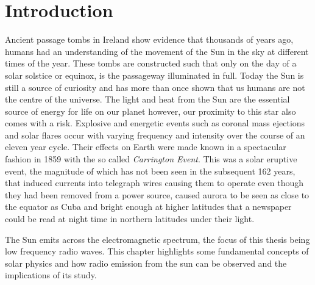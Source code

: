 \doublespacing
\chapter{Introduction}
\label{chap:intro}
Ancient passage tombs in Ireland show evidence that thousands of years ago, humans had an understanding of the movement of the Sun in the sky at different times of the year. These tombs are constructed such that only on the day of a solar solstice or equinox, is the passageway illuminated in full. Today the Sun is still a source of curiosity and has more than once shown that us humans are not the centre of the universe. The light and heat from the Sun are the essential source of energy for life on our planet however, our proximity to this star also comes with a risk. Explosive and energetic events such as coronal mass ejections and solar flares occur with varying frequency and intensity over the course of an eleven year cycle. Their effects on Earth were made known in a spectacular fashion in 1859 with the so called \textit{Carrington Event}. This was a solar eruptive event, the magnitude of which has not been seen in the subsequent 162 years, that induced currents into telegraph wires causing them to operate even though they had been removed from a power source, caused aurora to be seen as close to the equator as Cuba and bright enough at higher latitudes that a newspaper could be read at night time in northern latitudes under their light. 

The Sun emits across the electromagnetic spectrum, the focus of this thesis being low frequency radio waves. 
This chapter highlights some fundamental concepts of solar physics  and how radio emission from the sun can be observed and the implications of its study.

